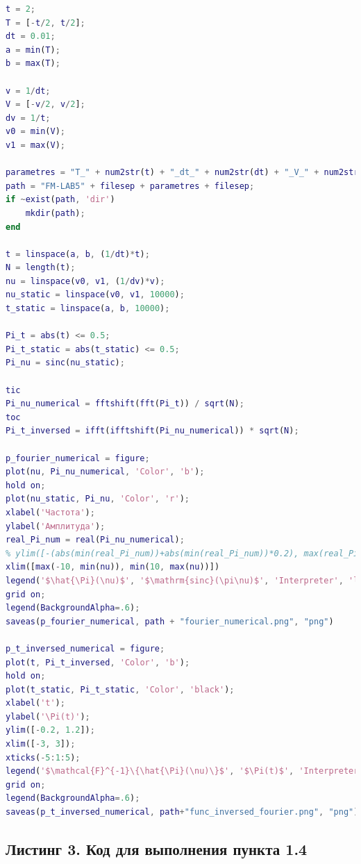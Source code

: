 \documentclass[a4paper]{article}
\begin{document}
\begin{lstlisting}[caption={Код для построения графиков для пункта 1.2}, language=matlab]
t = 2;
T = [-t/2, t/2];
dt = 0.01;
a = min(T);
b = max(T);

v = 1/dt;
V = [-v/2, v/2];
dv = 1/t;
v0 = min(V);
v1 = max(V);

parametres = "T_" + num2str(t) + "_dt_" + num2str(dt) + "_V_" + num2str(v) + "_dv_"+ num2str(dv);
path = "FM-LAB5" + filesep + parametres + filesep;
if ~exist(path, 'dir')
    mkdir(path);
end

t = linspace(a, b, (1/dt)*t);
N = length(t);
nu = linspace(v0, v1, (1/dv)*v);
nu_static = linspace(v0, v1, 10000);
t_static = linspace(a, b, 10000);

Pi_t = abs(t) <= 0.5;
Pi_t_static = abs(t_static) <= 0.5;
Pi_nu = sinc(nu_static);

tic
Pi_nu_numerical = fftshift(fft(Pi_t)) / sqrt(N);
toc
Pi_t_inversed = ifft(ifftshift(Pi_nu_numerical)) * sqrt(N);

p_fourier_numerical = figure;
plot(nu, Pi_nu_numerical, 'Color', 'b');
hold on;
plot(nu_static, Pi_nu, 'Color', 'r');
xlabel('Частота');
ylabel('Амплитуда');
real_Pi_num = real(Pi_nu_numerical);
% ylim([-(abs(min(real_Pi_num))+abs(min(real_Pi_num))*0.2), max(real_Pi_num)+max(real_Pi_num)*0.2])
xlim([max(-10, min(nu)), min(10, max(nu))])
legend('$\hat{\Pi}(\nu)$', '$\mathrm{sinc}(\pi\nu)$', 'Interpreter', 'latex', 'fontsize', 11)
grid on;
legend(BackgroundAlpha=.6);
saveas(p_fourier_numerical, path + "fourier_numerical.png", "png")

p_t_inversed_numerical = figure;
plot(t, Pi_t_inversed, 'Color', 'b');
hold on;
plot(t_static, Pi_t_static, 'Color', 'black');
xlabel('t');
ylabel('\Pi(t)');
ylim([-0.2, 1.2]);
xlim([-3, 3]);
xticks(-5:1:5);
legend('$\mathcal{F}^{-1}\{\hat{\Pi}(\nu)\}$', '$\Pi(t)$', 'Interpreter', 'latex', 'fontsize', 11)
grid on;
legend(BackgroundAlpha=.6);
saveas(p_t_inversed_numerical, path+"func_inversed_fourier.png", "png")
\end{lstlisting}

\subsection*{Листинг 3. Код для выполнения пункта 1.4}
\end{document}
